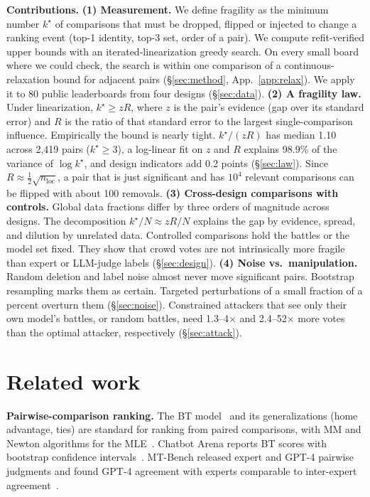 \documentclass{article}
\newcommand{\kstar}{k^\star}
\begin{document}
\textbf{Contributions.}
\textbf{(1) Measurement.} We define fragility as the minimum number $\kstar$ of comparisons that must be dropped, flipped or injected to change a ranking event (top-1 identity, top-3 set, order of a pair). We compute refit-verified upper bounds with an iterated-linearization greedy search. On every small board where we could check, the search is within one comparison of a continuous-relaxation bound for adjacent pairs (\S\ref{sec:method}, App.~\ref{app:relax}). We apply it to 80 public leaderboards from four designs (\S\ref{sec:data}).
\textbf{(2) A fragility law.} Under linearization, $\kstar \ge zR$, where $z$ is the pair's evidence (gap over its standard error) and $R$ is the ratio of that standard error to the largest single-comparison influence. Empirically the bound is nearly tight. $\kstar/(zR)$ has median 1.10 across 2,419 pairs ($\kstar\ge 3$), a log-linear fit on $z$ and $R$ explains 98.9\% of the variance of $\log\kstar$, and design indicators add 0.2 points (\S\ref{sec:law}). Since $R\approx\tfrac12\sqrt{n_{\mathrm{loc}}}$, a pair that is just significant and has $10^4$ relevant comparisons can be flipped with about 100 removals.
\textbf{(3) Cross-design comparisons with controls.} Global data fractions differ by three orders of magnitude across designs. The decomposition $\kstar/N \approx zR/N$ explains the gap by evidence, spread, and dilution by unrelated data. Controlled comparisons hold the battles or the model set fixed. They show that crowd votes are not intrinsically more fragile than expert or LLM-judge labels (\S\ref{sec:design}).
\textbf{(4) Noise vs.\ manipulation.} Random deletion and label noise almost never move significant pairs. Bootstrap resampling marks them as certain. Targeted perturbations of a small fraction of a percent overturn them (\S\ref{sec:noise}). Constrained attackers that see only their own model's battles, or random battles, need 1.3--4$\times$ and 2.4--52$\times$ more votes than the optimal attacker, respectively (\S\ref{sec:attack}).

\section{Related work}

\textbf{Pairwise-comparison ranking.} The BT model~\citep{bradley1952rank} and its generalizations (home advantage, ties) are standard for ranking from paired comparisons, with MM and Newton algorithms for the MLE~\citep{hunter2004mm}. Chatbot Arena reports BT scores with bootstrap confidence intervals~\citep{chiang2024chatbot,efron1979bootstrap}. MT-Bench released expert and GPT-4 pairwise judgments and found GPT-4 agreement with experts comparable to inter-expert agreement~\citep{zheng2023judging}.
\end{document}
